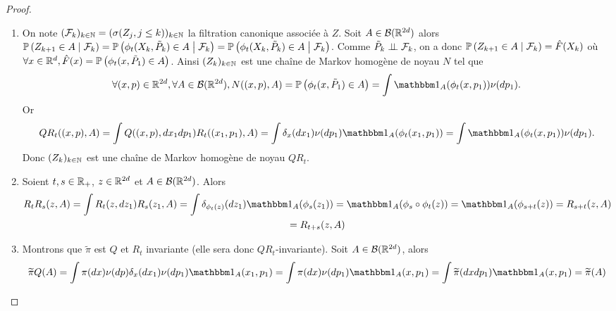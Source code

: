\documentclass[10pt,a4paper]{article}
\begin{document}
\begin{proof}
	\begin{enumerate}
		\item On note $(\mathcal{F}_k)_{k \in \mathbb{N}} = (\sigma(Z_j, j\leq k))_{k \in \mathbb{N}}$ la filtration canonique associée à $Z$. Soit $A \in \mathcal{B}(\mathbb{R}^{2d})$ alors $\PP[Z_{k+1} \in A \given{\calF_k}] = \PP[\phi_t(X_k, \tilde{P}_k) \in A \given{\calF_k}] = \PP[\phi_t(X_k, \tilde{P}_k) \in A \given{\calF_k}]$. Comme $\tilde{P}_k \perp\!\!\!\perp \mathcal{F}_k$, on a donc $\PP[Z_{k+1} \in A \given{\calF_k}] = \hat{F}(X_k)$ où $\forall x \in \rset^d, \hat{F}(x) = \PP[\phi_t(x, \tilde{P}_1) \in A]$. Ainsi $(Z_k)_{k \in \mathbb{N}}$ est une chaîne de Markov homogène de noyau $N$ tel que
		$$
		\forall (x,p) \in \rset^{2d}, \forall A \in \calB(\rset^{2d}), N((x,p), A) = \PP[\phi_t(x, \tilde{P}_1) \in A] = \int \ind_A(\phi_t(x, p_1)) \nu(dp_1).
		$$
		Or
		$$
		Q R_t((x,p),A) = \int Q((x,p), dx_1dp_1) R_t((x_1, p_1), A) = \int \delta_x(dx_1) \nu(dp_1) \ind_A(\phi_t(x_1, p_1)) = \int \ind_A(\phi_t(x,p_1)) \nu(dp_1).
		$$
		Donc $(Z_k)_{k \in \mathbb{N}}$ est une chaîne de Markov homogène de noyau $QR_t$.

		\item Soient $t,s \in \mathbb{R}_+$, $z \in \mathbb{R}^{2d}$ et $A \in \mathcal{B}(\mathbb{R}^{2d})$. Alors
                  \begin{multline*}
                    R_t R_s (z, A) = \int R_t(z, dz_1) R_s(z_1, A) = \int \delta_{\phi_t(z)}(dz_1) \ind_A(\phi_s(z_1)) = \ind_A(\phi_s \circ \phi_t(z)) = \ind_A(\phi_{s+t}(z)) = R_{s+t}(z,A) \\ = R_{t+s}(z,A)
                  \end{multline*}

		\item Montrons que $\widetilde{\pi}$ est $Q$ et $R_t$ invariante (elle sera donc $QR_t$-invariante). Soit $A \in \mathcal{B}(\mathbb{R}^{2d})$, alors
		$$
		\widetilde{\pi} Q (A) = \int \pi(dx) \nu(dp) \delta_x(dx_1) \nu(dp_1) \ind_A(x_1, p_1) = \int \pi(dx) \nu(dp_1) \ind_A(x, p_1) = \int \widetilde{\pi}(dxdp_1) \ind_A(x, p_1) = \widetilde{\pi}(A) 
		$$


\end{enumerate}
\end{proof}
\end{document}
